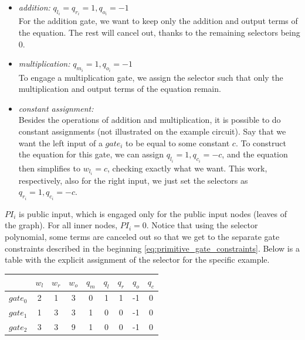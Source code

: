 \begin{itemize}
    \item \textit{addition:} $q_{l_i} = q_{r_i} = 1, q_{o_i} = -1$ \\
        For the addition gate, we want to keep only the addition and output terms of the equation. The rest will cancel out, thanks to the remaining selectors being 0.
    \item \textit{multiplication:} $q_{m_i} = 1, q_{o_i} = -1$ \\
        To engage a multiplication gate, we assign the selector such that only the multiplication and output terms of the equation remain.
    \item \textit{constant assignment:} \\
        Besides the operations of addition and multiplication, it is possible to do constant assignments (not illustrated on the example circuit). Say that we want the left input of a $gate_i$ to be equal to some constant $c$. To construct the equation for this gate, we can assign $q_{l_i} = 1, q_{c_i} = -c$, and the equation then simplifies to $w_{l_i} = c$, checking exactly what we want. This work, respectively, also for the right input, we just set the selectors as $q_{r_i} = 1, q_{c_i} = -c$.
\end{itemize}

$PI_i$ is public input, which is engaged only for the public input nodes (leaves of the graph). For all inner nodes, $PI_i = 0$. Notice that using the selector polynomial, some terms are canceled out so that we get to the separate gate constraints described in the beginning \eqref{eq:primitive_gate_constraints}. Below is a table with the explicit assignment of the selector for the specific example. 


\begin{table}[H]
\begin{tabular}{|c|c|c|c|c|c|c|c|c|}
\hline
         & $w_l$ & $w_r$ & $w_o$ & $q_m$ & $q_l$ & $q_r$ & $q_o$ & $q_c$ \\ \hline
$gate_0$  & 2     & 1     & 3     & 0     & 1     & 1     & -1    & 0     \\ \hline
$gate_1$ & 1     & 3     & 3     & 1     & 0     & 0     & -1    & 0     \\ \hline
$gate_2$ & 3     & 3     & 9     & 1     & 0     & 0     & -1    & 0     \\ \hline
\end{tabular}
\end{table}

